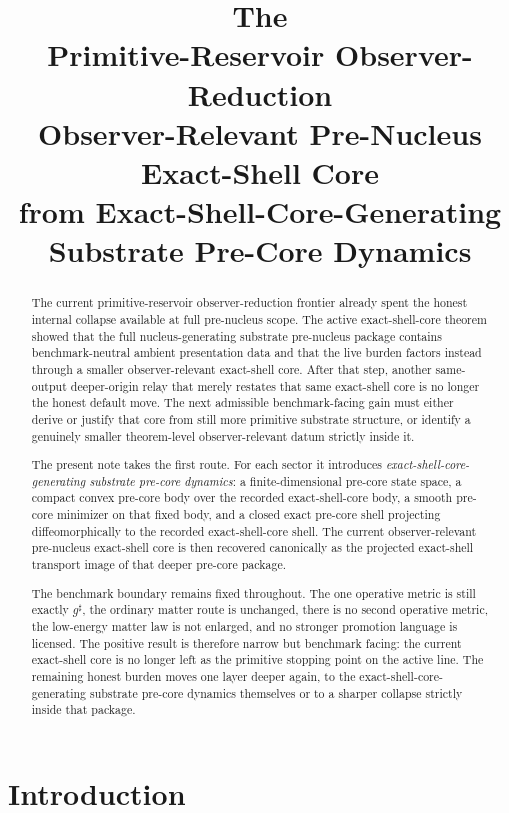 \documentclass[11pt]{article}
\title{\textbf{The \TheoryName{}}\\[0.4em]
\large Primitive-Reservoir Observer-Reduction\\
\large Observer-Relevant Pre-Nucleus Exact-Shell Core\\
\large from Exact-Shell-Core-Generating Substrate Pre-Core Dynamics}
\author{}
\date{}
\newcommand{\CompletedMetric}{g^{\sharp}}
\begin{document}
\maketitle

\begin{abstract}
The current primitive-reservoir observer-reduction frontier already spent the honest internal collapse available at full pre-nucleus scope. The active exact-shell-core theorem showed that the full nucleus-generating substrate pre-nucleus package contains benchmark-neutral ambient presentation data and that the live burden factors instead through a smaller observer-relevant exact-shell core. After that step, another same-output deeper-origin relay that merely restates that same exact-shell core is no longer the honest default move. The next admissible benchmark-facing gain must either derive or justify that core from still more primitive substrate structure, or identify a genuinely smaller theorem-level observer-relevant datum strictly inside it.

The present note takes the first route. For each sector it introduces \emph{exact-shell-core-generating substrate pre-core dynamics}: a finite-dimensional pre-core state space, a compact convex pre-core body over the recorded exact-shell-core body, a smooth pre-core minimizer on that fixed body, and a closed exact pre-core shell projecting diffeomorphically to the recorded exact-shell-core shell. The current observer-relevant pre-nucleus exact-shell core is then recovered canonically as the projected exact-shell transport image of that deeper pre-core package.

The benchmark boundary remains fixed throughout. The one operative metric is still exactly \(\CompletedMetric\), the ordinary matter route is unchanged, there is no second operative metric, the low-energy matter law is not enlarged, and no stronger promotion language is licensed. The positive result is therefore narrow but benchmark facing: the current exact-shell core is no longer left as the primitive stopping point on the active line. The remaining honest burden moves one layer deeper again, to the exact-shell-core-generating substrate pre-core dynamics themselves or to a sharper collapse strictly inside that package.
\end{abstract}

\section{Introduction}
\end{document}
